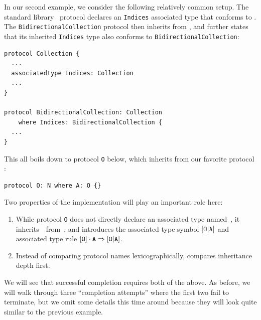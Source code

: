 \documentclass[../generics]{subfiles}
\begin{document}
\begin{example}\label{ex:protocol o fcrs}
In our second example, we consider the following relatively common setup. The standard library \tCollection\ protocol declares an \texttt{Indices} associated type that conforms to \tCollection. The \texttt{BidirectionalCollection} protocol then inherits from \tCollection, and further states that its inherited \texttt{Indices} type also conforms to \texttt{BidirectionalCollection}:
\begin{Verbatim}
protocol Collection {
  ...
  associatedtype Indices: Collection
  ...
}

protocol BidirectionalCollection: Collection
    where Indices: BidirectionalCollection {
  ...
}
\end{Verbatim}
This all boils down to protocol \texttt{O} below, which inherits from our favorite protocol \tN:
\begin{Verbatim}
protocol O: N where A: O {}
\end{Verbatim}
Two properties of the implementation will play an important role here:
\begin{enumerate}
\item While protocol \texttt{O} does not directly declare an associated type named~\nA, it inherits~\nA\ from~\tN, and  introduces the associated type symbol $[\texttt{O}|\texttt{A}]$ and associated type rule $[\texttt{O}]\cdot\texttt{A}\Rightarrow[\texttt{O}|\texttt{A}]$.

\item Instead of comparing protocol names lexicographically,  compares inheritance depth first.
\end{enumerate}
We will see that successful completion requires both of the above. As before, we will walk through three ``completion attempts'' where the first two fail to terminate, but we omit some details this time around because they will look quite similar to the previous example.

\smallskip


\end{example}
\end{document}

